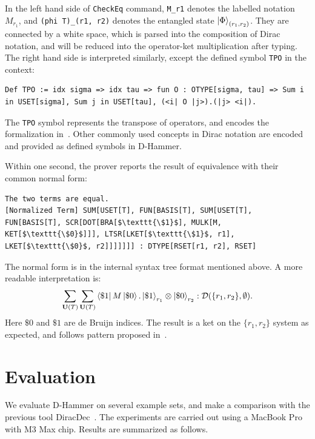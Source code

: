 In the left hand side of \texttt{\textcolor{NavyBlue}{CheckEq}} command, \texttt{M\_r1} denotes the labelled notation $M_{r_1}$, and \texttt{(phi T)\_(r1, r2)} denotes the entangled state $\ket{\Phi}_{(r_1, r_2)}$. They are connected by a white space, which is parsed into the composition of Dirac notation, and will be reduced into the operator-ket multiplication after typing. The right hand side is interpreted similarly, except the defined symbol \texttt{TPO} in the context:

\begin{lstlisting}[style=dhammer]
Def TPO := idx sigma => idx tau => fun O : OTYPE[sigma, tau] => Sum i in USET[sigma], Sum j in USET[tau], (<i| O |j>).(|j> <i|).
\end{lstlisting}

The \texttt{TPO} symbol represents the transpose of operators, and encodes the formalization in~. Other commonly used concepts in Dirac notation are encoded and provided as defined symbols in D-Hammer.

Within one second, the prover reports the result of equivalence with their common normal form:
    \begin{lstlisting}[style=dhammer]
The two terms are equal.
[Normalized Term] SUM[USET[T], FUN[BASIS[T], SUM[USET[T], FUN[BASIS[T], SCR[DOT[BRA[$\texttt{\$1}$], MULK[M, KET[$\texttt{\$0}$]]], LTSR[LKET[$\texttt{\$1}$, r1], LKET[$\texttt{\$0}$, r2]]]]]]] : DTYPE[RSET[r1, r2], RSET]
    \end{lstlisting}

The normal form is in the internal syntax tree format mentioned above. A more readable interpretation is:
\[
\sum_{\mathbf{U}(T)} \sum_{\mathbf{U}(T)} \bra{\$1}M\ket{\$ 0} . \ket{\$1}_{r_1} \otimes \ket{\$0}_{r_2} : \mathcal{D}(\{r_1, r_2\}, \emptyset).
\]
Here $\$0$ and $\$1$ are de Bruijn indices. The result is a ket on the $\{r_1, r_2\}$ system as expected, and follows pattern proposed in~.



\section{Evaluation}
We evaluate D-Hammer on several example sets, and make a comparison with the previous tool DiracDec~\cite{diracdec}.
The experiments are carried out using a MacBook Pro with M3 Max chip. Results are summarized as follows.

